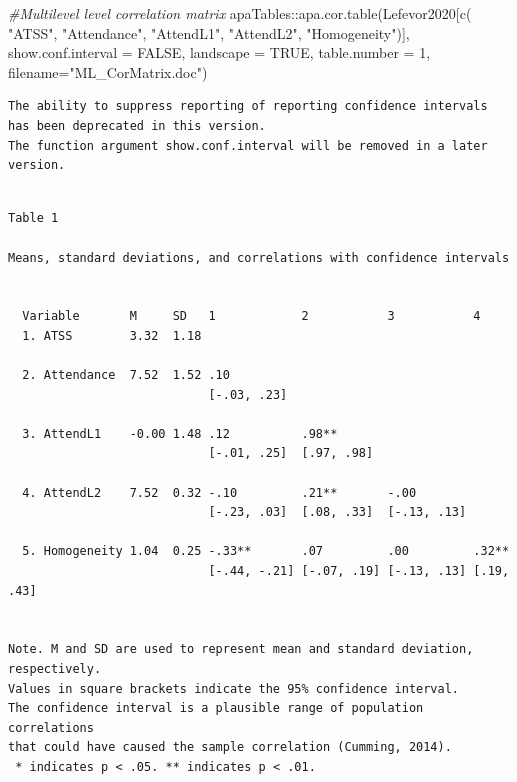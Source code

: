 \documentclass[
  11pt,
]{book}
\newenvironment{Shaded}{\begin{snugshade}}{\end{snugshade}}
\newcommand{\AttributeTok}[1]{\textcolor[rgb]{0.77,0.63,0.00}{#1}}
\newcommand{\CommentTok}[1]{\textcolor[rgb]{0.56,0.35,0.01}{\textit{#1}}}
\newcommand{\ConstantTok}[1]{\textcolor[rgb]{0.00,0.00,0.00}{#1}}
\newcommand{\DecValTok}[1]{\textcolor[rgb]{0.00,0.00,0.81}{#1}}
\newcommand{\FunctionTok}[1]{\textcolor[rgb]{0.00,0.00,0.00}{#1}}
\newcommand{\NormalTok}[1]{#1}
\newcommand{\SpecialCharTok}[1]{\textcolor[rgb]{0.00,0.00,0.00}{#1}}
\newcommand{\StringTok}[1]{\textcolor[rgb]{0.31,0.60,0.02}{#1}}
\begin{document}
\begin{Shaded}
\begin{Highlighting}[]
\CommentTok{\#Multilevel level correlation matrix}
\NormalTok{apaTables}\SpecialCharTok{::}\FunctionTok{apa.cor.table}\NormalTok{(Lefevor2020[}\FunctionTok{c}\NormalTok{(}
\StringTok{"ATSS"}\NormalTok{, }\StringTok{"Attendance"}\NormalTok{, }\StringTok{"AttendL1"}\NormalTok{, }\StringTok{"AttendL2"}\NormalTok{, }\StringTok{"Homogeneity"}\NormalTok{)], }\AttributeTok{show.conf.interval =} \ConstantTok{FALSE}\NormalTok{, }\AttributeTok{landscape =} \ConstantTok{TRUE}\NormalTok{, }\AttributeTok{table.number =} \DecValTok{1}\NormalTok{, }\AttributeTok{filename=}\StringTok{"ML\_CorMatrix.doc"}\NormalTok{)}
\end{Highlighting}
\end{Shaded}

\begin{verbatim}
The ability to suppress reporting of reporting confidence intervals has been deprecated in this version.
The function argument show.conf.interval will be removed in a later version.
\end{verbatim}

\begin{verbatim}

Table 1 

Means, standard deviations, and correlations with confidence intervals
 

  Variable       M     SD   1            2           3           4         
  1. ATSS        3.32  1.18                                                
                                                                           
  2. Attendance  7.52  1.52 .10                                            
                            [-.03, .23]                                    
                                                                           
  3. AttendL1    -0.00 1.48 .12          .98**                             
                            [-.01, .25]  [.97, .98]                        
                                                                           
  4. AttendL2    7.52  0.32 -.10         .21**       -.00                  
                            [-.23, .03]  [.08, .33]  [-.13, .13]           
                                                                           
  5. Homogeneity 1.04  0.25 -.33**       .07         .00         .32**     
                            [-.44, -.21] [-.07, .19] [-.13, .13] [.19, .43]
                                                                           

Note. M and SD are used to represent mean and standard deviation, respectively.
Values in square brackets indicate the 95% confidence interval.
The confidence interval is a plausible range of population correlations 
that could have caused the sample correlation (Cumming, 2014).
 * indicates p < .05. ** indicates p < .01.
 
\end{verbatim}
\end{document}
